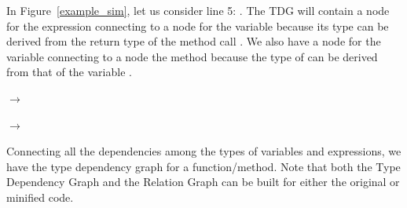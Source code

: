 In Figure~\ref{example_sim}, let us consider line 5: . The TDG will contain a node for the expression
 connecting to a node for the variable 
because its type can be derived from the return type of the method
call . We also have a node for the variable
 connecting to a node the method 
because the type of  can be derived from
that of the variable .

 $\rightarrow$ 

 $\rightarrow$ 

Connecting all the dependencies among the types of variables and
expressions, we have the type dependency graph for a
function/method. Note that both the Type Dependency Graph and the
Relation Graph can be built for either the original or minified code.

